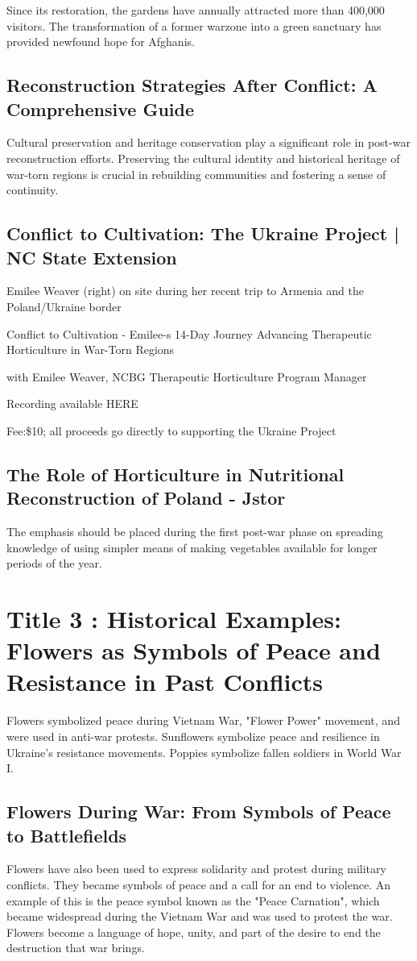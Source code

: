 \documentclass[12pt]{article}
\begin{document}
Since its restoration, the gardens have annually attracted more than 400,000 visitors. The transformation of a former warzone into a green sanctuary has provided newfound hope for Afghanis.\subsection{Reconstruction Strategies After Conflict: A Comprehensive Guide}
Cultural preservation and heritage conservation play a significant role in post-war reconstruction efforts. Preserving the cultural identity and historical heritage of war-torn regions is crucial in rebuilding communities and fostering a sense of continuity.\subsection{Conflict to Cultivation: The Ukraine Project | NC State Extension}
Emilee Weaver (right) on site during her recent trip to Armenia and the Poland/Ukraine border

Conflict to Cultivation - Emilee-s 14-Day Journey Advancing Therapeutic Horticulture in War-Torn Regions

with Emilee Weaver, NCBG Therapeutic Horticulture Program Manager

Recording available HERE

Fee:\$10; all proceeds go directly to supporting the Ukraine Project\subsection{The Role of Horticulture in Nutritional Reconstruction of Poland - Jstor}
The emphasis should be placed during the first post-war phase on spreading knowledge of using simpler means of making vegetables available for longer periods of the year.
\section{Title 3 : Historical Examples:  Flowers as Symbols of Peace and Resistance in Past Conflicts}
Flowers symbolized peace during Vietnam War, "Flower Power" movement, and were used in anti-war protests. Sunflowers symbolize peace and resilience in Ukraine's resistance movements. Poppies symbolize fallen soldiers in World War I.\subsection{Flowers During War: From Symbols of Peace to Battlefields}
Flowers have also been used to express solidarity and protest during military conflicts. They became symbols of peace and a call for an end to violence. An example of this is the peace symbol known as the "Peace Carnation", which became widespread during the Vietnam War and was used to protest the war. Flowers become a language of hope, unity, and part of the desire to end the destruction that war brings.
\end{document}
